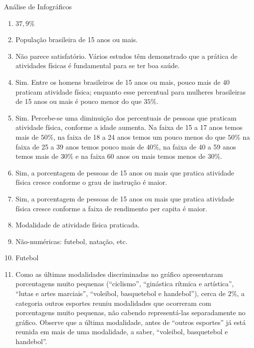 \begin{answer}{Análise de Infográficos}
{
\begin{enumerate}[itemsep=2pt]

\item $37{,}9\%$

\item População brasileira de 15 anos ou mais.

\item Não parece satisfatório. Vários estudos têm demonstrado que a prática de atividades físicas é fundamental para se ter boa saúde.

\item Sim. Entre os homens brasileiros de 15 anos ou mais, pouco mais de $40$ praticam atividade física; enquanto esse percentual para mulheres brasileiras de 15 anos ou mais é pouco menor do que $35\%.$

\item Sim. Percebe-se uma diminuição dos percentuais de pessoas que praticam atividade física, conforme a idade aumenta. Na faixa de 15 a 17 anos temos mais de $50\%$, na faixa de 18 a 24 anos temos um pouco menos do que $50\%$ na faixa de 25 a 39 anos temos pouco mais de $40\%$, na faixa de 40 a 59 anos temos mais de $30\%$ e na faixa 60 anos ou mais temos menos de $30\%$.

\item Sim, a porcentagem de pessoas de 15 anos ou mais que pratica atividade física cresce conforme o grau de instrução é maior.

\item Sim, a porcentagem de pessoas de 15 anos ou mais que pratica atividade física cresce conforme a faixa de rendimento per capita é maior.

\item Modalidade de atividade física praticada.

\item Não-numéricas: futebol, natação, etc.

\item Futebol

\item Como as últimas modalidades discriminadas no gráfico apresentaram porcentagens muito pequenas (“ciclismo”, “ginástica rítmica e artística”, “lutas e artes marciais”, “voleibol, basquetebol e handebol”), cerca de $2\%$, a categoria outros esportes reuniu modalidades que ocorreram com porcentagens muito pequenas, não cabendo representá-las separadamente no gráfico. Observe que a última modalidade, antes de “outros esportes” já está reunida em mais de uma modalidade, a saber, “voleibol, basquetebol e handebol”.


\end{enumerate}}
\end{answer}
